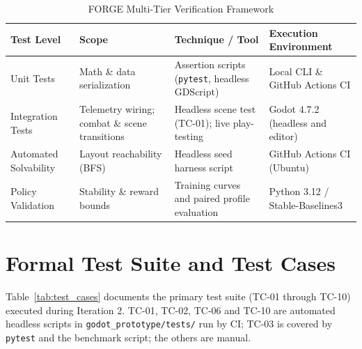 \begin{table}[!htbp]
\centering
\caption{FORGE Multi-Tier Verification Framework}
\label{tab:test_levels}
\small
\begin{tabular}{p{}p{}p{}p{}}
\toprule
\textbf{Test Level} & \textbf{Scope} & \textbf{Technique / Tool} & \textbf{Execution Environment} \\
\midrule
Unit Tests & Math \& data serialization & Assertion scripts (\texttt{pytest}, headless GDScript) & Local CLI \& GitHub Actions CI \\
Integration Tests & Telemetry wiring; combat \& scene transitions & Headless scene test (TC-01); live play-testing & Godot 4.7.2 (headless and editor) \\
Automated Solvability & Layout reachability (BFS) & Headless seed harness script & GitHub Actions CI (Ubuntu) \\
Policy Validation & Stability \& reward bounds & Training curves and paired profile evaluation & Python 3.12 / Stable-Baselines3 \\
\bottomrule
\end{tabular}
\end{table}

\section{Formal Test Suite and Test Cases}
Table~\ref{tab:test_cases} documents the primary test suite (TC-01 through TC-10) executed during Iteration 2. TC-01, TC-02, TC-06 and TC-10 are automated headless scripts in \texttt{godot\_prototype/tests/} run by CI; TC-03 is covered by \texttt{pytest} and the benchmark script; the others are manual.

